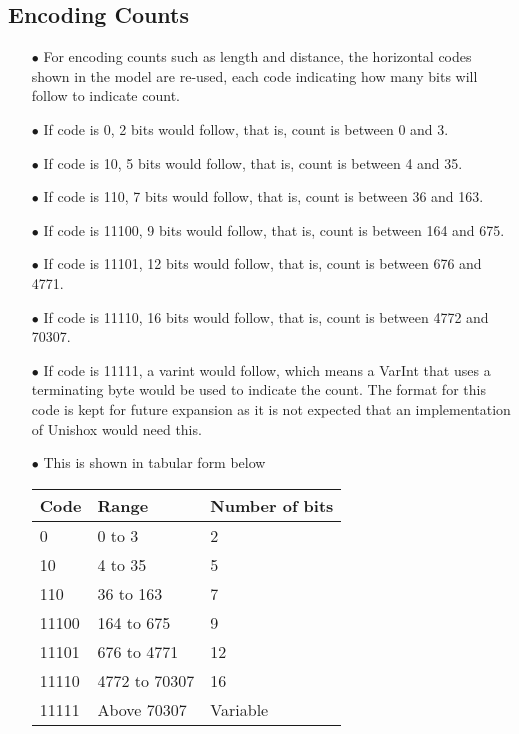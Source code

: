 \documentclass[]{article}
\begin{document}
\subsection{Encoding Counts}
\begin{itemize}
	\item[$\bullet$] For encoding counts such as length and distance, the horizontal codes shown in the model are re-used, each code indicating how many bits will follow to indicate count.
	\item[$\bullet$] If code is 0, 2 bits would follow, that is, count is between 0 and 3.
	\item[$\bullet$] If code is 10, 5 bits would follow, that is, count is between 4 and 35.
	\item[$\bullet$] If code is 110, 7 bits would follow, that is, count is between 36 and 163.
	\item[$\bullet$] If code is 11100, 9 bits would follow, that is, count is between 164 and 675.
	\item[$\bullet$] If code is 11101, 12 bits would follow, that is, count is between 676 and 4771.
	\item[$\bullet$] If code is 11110, 16 bits would follow, that is, count is between 4772 and 70307.
	\item[$\bullet$] If code is 11111, a varint would follow, which means a VarInt that uses a terminating byte would be used to indicate the count.  The format for this code is kept for future expansion as it is not expected that an implementation of Unishox would need this.
	\item[$\bullet$] This is shown in tabular form below
	\item[] \begin{tabular}{ | l | l | l |} \hline
	﻿\textbf{Code} & ﻿\textbf{Range} & ﻿\textbf{Number of bits} \\ \hline
	0 & 0 to 3 & 2 \\ \hline
	10 & 4 to 35 & 5 \\ \hline
	110 & 36 to 163 & 7 \\ \hline
	11100 & 164 to 675 & 9 \\ \hline
	11101 & 676 to 4771 & 12 \\ \hline
	11110 & 4772 to 70307 & 16 \\ \hline
	11111 & Above 70307 & Variable \\ \hline
\end{tabular}
\end{itemize}
\end{document}
